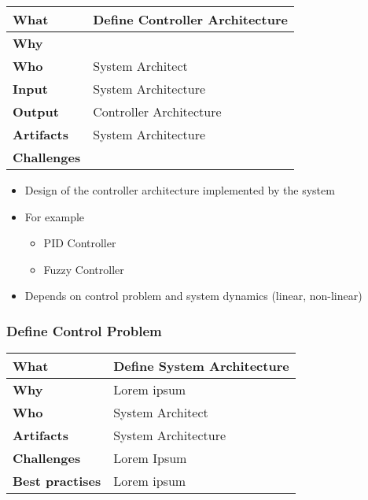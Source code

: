 \begin{minipage}{\textwidth}
 \label{table:ch6_Task_Define_Controller_Architecture}
\begin{tabular}
	{|m{3cm}|m{10cm}|} \hline \bfseries What & Define Controller Architecture\\
	\hline \bfseries Why & \\
	\hline \bfseries Who & System Architect\\
	\hline \bfseries Input & System Architecture\\
	\hline \bfseries Output & Controller Architecture\\
	\hline \bfseries Artifacts & System Architecture\\
	\hline \bfseries Challenges & \\
	\hline 
\end{tabular}
\end{minipage}

\begin{itemize}
	\item Design of the controller architecture implemented by the system
	\item For example
	\begin{itemize}
		\item PID Controller
		\item Fuzzy Controller
	\end{itemize}
	\item Depends on control problem and system dynamics (linear, non-linear)
\end{itemize}

\subsubsection{Define Control Problem}
\begin{minipage}{\textwidth}
 \label{table:ch6_Task_Define_Control_Problem}
\begin{tabular}
	{|m{3cm}|m{10cm}|} \hline \bfseries What & Define System Architecture\\
	\hline \bfseries Why & Lorem ipsum\\
	\hline \bfseries Who & System Architect\\
	\hline \bfseries Artifacts & System Architecture\\
	\hline \bfseries Challenges & Lorem Ipsum\\
	\hline \bfseries Best practises & Lorem ipsum\\
	\hline 
\end{tabular}
\end{minipage}

